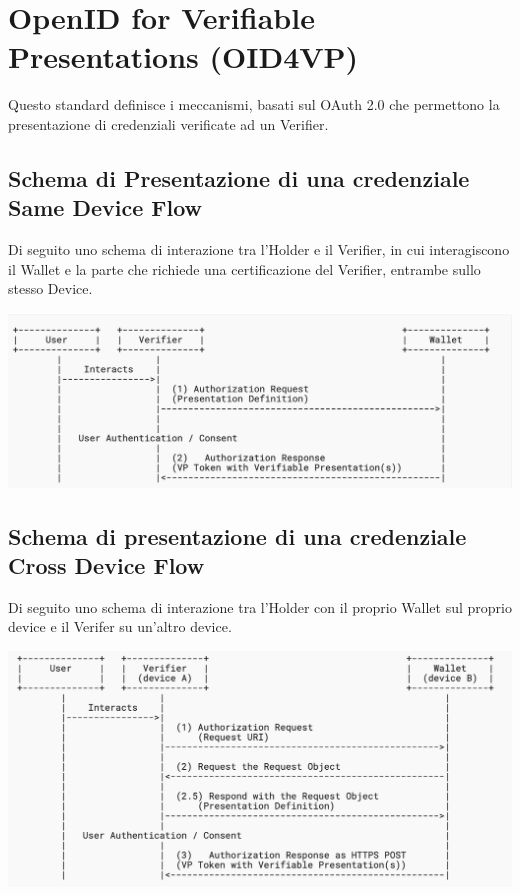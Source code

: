 \section{OpenID for Verifiable Presentations (OID4VP)}
Questo standard definisce i meccanismi, basati sul OAuth 2.0 che permettono la presentazione di credenziali verificate ad un Verifier.

\subsection{Schema di Presentazione di una credenziale Same Device Flow}
Di seguito uno schema di interazione tra l'Holder e il Verifier, in cui interagiscono il Wallet e la parte che richiede una
certificazione del Verifier, entrambe sullo stesso Device.
\begin{center}
	\includegraphics[scale = 0.3]{./res/images/PresentationSameDevice.jpg}
\end{center}

\subsection{Schema di presentazione di una credenziale Cross Device Flow}
Di seguito uno schema di interazione tra l'Holder con il proprio Wallet sul proprio device e il Verifer su un'altro device.\\

\begin{center}
	\includegraphics[scale = 0.3]{./res/images/PresentationCrossDevice.jpg}
\end{center}

